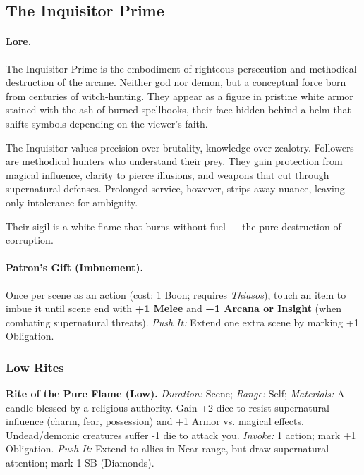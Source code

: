 \subsection{The Inquisitor Prime}
\label{patron:inquisitor-prime}

\paragraph{Lore.} 
The Inquisitor Prime is the embodiment of righteous persecution and methodical destruction of the arcane. Neither god nor demon, but a conceptual force born from centuries of witch-hunting. They appear as a figure in pristine white armor stained with the ash of burned spellbooks, their face hidden behind a helm that shifts symbols depending on the viewer's faith.  

The Inquisitor values precision over brutality, knowledge over zealotry. Followers are methodical hunters who understand their prey. They gain protection from magical influence, clarity to pierce illusions, and weapons that cut through supernatural defenses. Prolonged service, however, strips away nuance, leaving only intolerance for ambiguity.  

Their sigil is a white flame that burns without fuel --- the pure destruction of corruption.

\paragraph{Patron's Gift (Imbuement).} 
Once per scene as an action (cost: 1 Boon; requires \emph{Thiasos}), touch an item to imbue it until scene end with \textbf{+1 Melee} and \textbf{+1 Arcana or Insight} (when combating supernatural threats).  
\emph{Push It:} Extend one extra scene by marking +1 Obligation.

\subsubsection*{Low Rites}

\textbf{Rite of the Pure Flame (Low).}  
\emph{Duration:} Scene; \emph{Range:} Self; \emph{Materials:} A candle blessed by a religious authority.  
Gain +2 dice to resist supernatural influence (charm, fear, possession) and +1 Armor vs. magical effects. Undead/demonic creatures suffer -1 die to attack you.  
\emph{Invoke:} 1 action; mark +1 Obligation.  
\emph{Push It:} Extend to allies in Near range, but draw supernatural attention; mark 1 SB (Diamonds).

